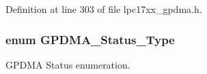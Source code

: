 \-Definition at line 303 of file lpc17xx\-\_\-gpdma.\-h.

\hypertarget{group___g_p_d_m_a___public___types_ga456b34475c3dc2d589cb06dcc13f4159}{
\subsubsection[{\-G\-P\-D\-M\-A\-\_\-\-Status\-\_\-\-Type}]{\setlength{\rightskip}{0pt plus 5cm}enum {\bf \-G\-P\-D\-M\-A\-\_\-\-Status\-\_\-\-Type}}}\label{group___g_p_d_m_a___public___types_ga456b34475c3dc2d589cb06dcc13f4159}


\-G\-P\-D\-M\-A \-Status enumeration. 


